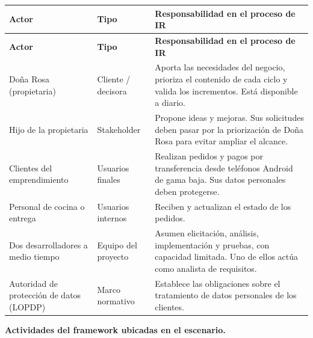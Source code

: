 \documentclass[12pt,a4paper]{article}
\begin{document}
{\small
\setlength{\tabcolsep}{4pt}
\renewcommand{\arraystretch}{1.3}
\begin{longtable}{
|>{\raggedright\arraybackslash}p{}
|>{\raggedright\arraybackslash}p{}
|>{\raggedright\arraybackslash}p{}|}
\hline
\textbf{Actor} & \textbf{Tipo} & \textbf{Responsabilidad en el proceso de IR} \\
\hline
\endfirsthead
\hline
\textbf{Actor} & \textbf{Tipo} & \textbf{Responsabilidad en el proceso de IR} \\
\hline
\endhead
Doña Rosa (propietaria) & Cliente / decisora & Aporta las necesidades del negocio, prioriza el contenido de cada ciclo y valida los incrementos. Está disponible a diario. \\
\hline
Hijo de la propietaria & Stakeholder & Propone ideas y mejoras. Sus solicitudes deben pasar por la priorización de Doña Rosa para evitar ampliar el alcance. \\
\hline
Clientes del emprendimiento & Usuarios finales & Realizan pedidos y pagos por transferencia desde teléfonos Android de gama baja. Sus datos personales deben protegerse. \\
\hline
Personal de cocina o entrega & Usuarios internos & Reciben y actualizan el estado de los pedidos. \\
\hline
Dos desarrolladores a medio tiempo & Equipo del proyecto & Asumen elicitación, análisis, implementación y pruebas, con capacidad limitada. Uno de ellos actúa como analista de requisitos. \\
\hline
Autoridad de protección de datos (LOPDP) & Marco normativo & Establece las obligaciones sobre el tratamiento de datos personales de los clientes. \\
\hline
\end{longtable}
}

\textbf{Actividades del framework ubicadas en el escenario.}
\end{document}
